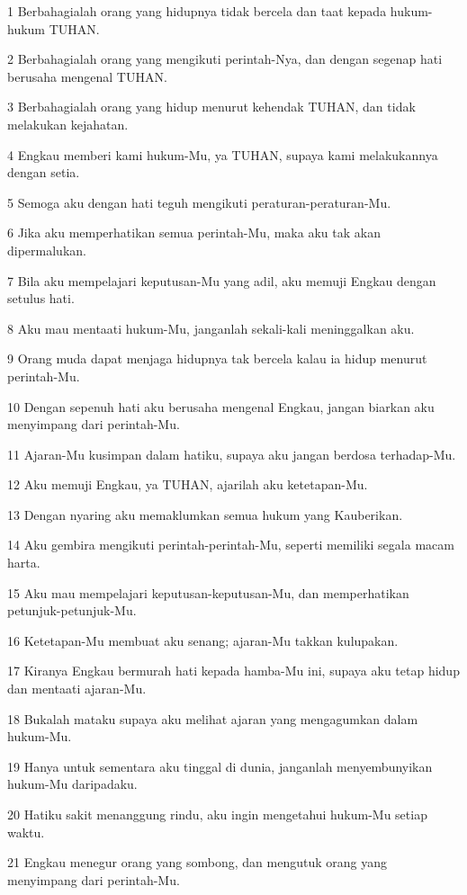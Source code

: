 \par 1 Berbahagialah orang yang hidupnya tidak bercela dan taat kepada hukum-hukum TUHAN.
\par 2 Berbahagialah orang yang mengikuti perintah-Nya, dan dengan segenap hati berusaha mengenal TUHAN.
\par 3 Berbahagialah orang yang hidup menurut kehendak TUHAN, dan tidak melakukan kejahatan.
\par 4 Engkau memberi kami hukum-Mu, ya TUHAN, supaya kami melakukannya dengan setia.
\par 5 Semoga aku dengan hati teguh mengikuti peraturan-peraturan-Mu.
\par 6 Jika aku memperhatikan semua perintah-Mu, maka aku tak akan dipermalukan.
\par 7 Bila aku mempelajari keputusan-Mu yang adil, aku memuji Engkau dengan setulus hati.
\par 8 Aku mau mentaati hukum-Mu, janganlah sekali-kali meninggalkan aku.
\par 9 Orang muda dapat menjaga hidupnya tak bercela kalau ia hidup menurut perintah-Mu.
\par 10 Dengan sepenuh hati aku berusaha mengenal Engkau, jangan biarkan aku menyimpang dari perintah-Mu.
\par 11 Ajaran-Mu kusimpan dalam hatiku, supaya aku jangan berdosa terhadap-Mu.
\par 12 Aku memuji Engkau, ya TUHAN, ajarilah aku ketetapan-Mu.
\par 13 Dengan nyaring aku memaklumkan semua hukum yang Kauberikan.
\par 14 Aku gembira mengikuti perintah-perintah-Mu, seperti memiliki segala macam harta.
\par 15 Aku mau mempelajari keputusan-keputusan-Mu, dan memperhatikan petunjuk-petunjuk-Mu.
\par 16 Ketetapan-Mu membuat aku senang; ajaran-Mu takkan kulupakan.
\par 17 Kiranya Engkau bermurah hati kepada hamba-Mu ini, supaya aku tetap hidup dan mentaati ajaran-Mu.
\par 18 Bukalah mataku supaya aku melihat ajaran yang mengagumkan dalam hukum-Mu.
\par 19 Hanya untuk sementara aku tinggal di dunia, janganlah menyembunyikan hukum-Mu daripadaku.
\par 20 Hatiku sakit menanggung rindu, aku ingin mengetahui hukum-Mu setiap waktu.
\par 21 Engkau menegur orang yang sombong, dan mengutuk orang yang menyimpang dari perintah-Mu.
